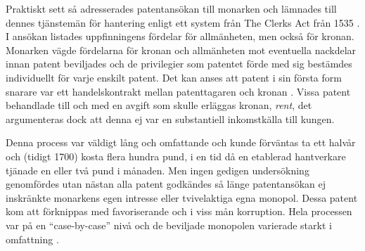 Praktiskt sett så adresserades patentansökan till monarken och lämnades till dennes tjänstemän för hantering enligt ett
system från The Clerks Act från 1535 \cite{bracha}. I ansökan listades uppfinningens fördelar för allmänheten, men också
för kronan. Monarken vägde fördelarna för kronan och allmänheten mot eventuella nackdelar innan patent
beviljades och de privilegier som patentet förde med sig bestämdes individuellt för varje enskilt patent. Det kan anses att patent i sin första form snarare var ett handelskontrakt mellan patenttagaren och kronan
\cite{bracha}. Vissa patent behandlade till och med en avgift som skulle erläggas kronan, \emph{rent},
det argumenteras dock att denna ej var en substantiell inkomstkälla till kungen. \cite{macleod2}


Denna process var väldigt lång och omfattande och kunde
förväntas ta ett halvår och (tidigt 1700) kosta flera hundra pund, i en tid då en etablerad hantverkare tjänade en eller två pund i månaden. \cite{macleod}
Men ingen gedigen undersökning genomfördes utan nästan alla patent godkändes så
länge patentansökan ej inskränkte monarkens egen intresse eller tvivelaktiga egna monopol. 
Dessa patent kom att förknippas med favoriserande och i viss mån korruption. Hela processen var på en
``case-by-case'' nivå och de beviljade monopolen varierade starkt i omfattning \cite{bracha}.

%


